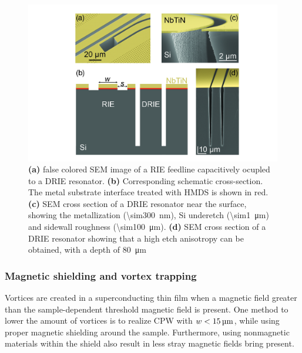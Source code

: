   \begin{figure}[h]
    \centering
    \includegraphics[width=.92\textwidth]{Figures/DRIE/DRIE figure.jpg}
    \caption{\textbf{(a)} false colored SEM image of a RIE feedline capacitively ocupled to a DRIE resonator. \textbf{(b)} Corresponding schematic cross-section. The metal substrate interface treated with HMDS is shown in red. \textbf{(c)} SEM cross section of a DRIE resonator near the surface, showing the metallization (\SI{\sim300}{\nano \meter}), Si underetch (\SI{\sim1}{\micro \meter}) and sidewall roughness (\SI{\sim100}{\micro \meter}). \textbf{(d)} SEM cross section of a DRIE resonator showing that a high etch anisotropy can be obtained, with a depth of \SI{80}{\micro \meter}}
    \label{fig:DRIE schematic}
  \end{figure}

  \subsubsection{Magnetic shielding and vortex trapping}

  Vortices are created in a superconducting thin film when a magnetic field greater than the sample-dependent threshold magnetic field is present. One method to lower the amount of vortices is to realize CPW with $w < \text{\ensuremath{\SI{15}{\micro \meter}}}$, while using proper magnetic shielding around the sample. Furthermore, using nonmagnetic materials within the shield also result in less stray magnetic fields bring present.

